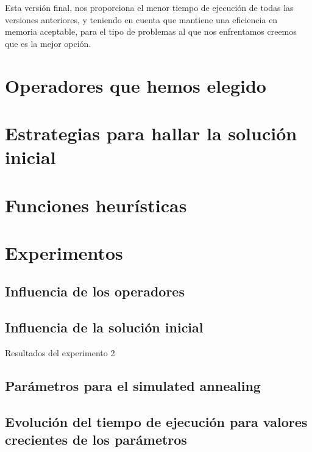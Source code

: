 Esta versión final, nos proporciona el menor tiempo de ejecución de todas las versiones anteriores, y teniendo en cuenta que mantiene una eficiencia en memoria aceptable, para el tipo de problemas al que nos enfrentamos creemos que es la mejor opción. 



\section{Operadores que hemos elegido}

\section{Estrategias para hallar la solución inicial}

\section{Funciones heurísticas}

\section{Experimentos}

\subsection{Influencia de los operadores}

\subsection{Influencia de la solución inicial}

\begin{table}[H]
    \caption{Resultados del experimento 2}%
    \label{tab:ex2}
    \begin{center}
    
    \end{center}
\end{table}

\subsection{Parámetros para el simulated annealing}

\subsection{Evolución del tiempo de ejecución para valores crecientes de los parámetros}

